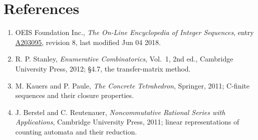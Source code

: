 \documentclass[11pt]{article}
\theoremstyle{definition}
\begin{document}
\section{References}

\begin{enumerate}

\item OEIS Foundation Inc., \emph{The On-Line Encyclopedia of Integer Sequences}, entry \href{https://oeis.org/A203095}{A203095}, revision 8, last modified Jun 04 2018.

\item R. P. Stanley, \emph{Enumerative Combinatorics}, Vol.~1, 2nd ed., Cambridge University Press, 2012; \S4.7, the transfer-matrix method.

\item M. Kauers and P. Paule, \emph{The Concrete Tetrahedron}, Springer, 2011; C-finite sequences and their closure properties.

\item J. Berstel and C. Reutenauer, \emph{Noncommutative Rational Series with Applications}, Cambridge University Press, 2011; linear representations of counting automata and their reduction.

\end{enumerate}
\end{document}
